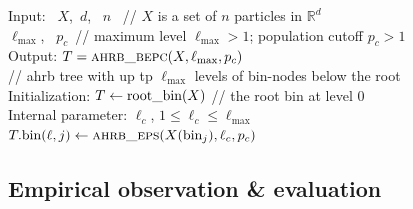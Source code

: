 \documentclass[final]{juliacon}
\begin{document}
\begin{algorithm}[h] 
  \caption{\small%
    AHRB\_BECP for {\sc ahrb} construction }
  \label{alg:block-ECP} 
  \small
  \SetAlgoLined
  {\rm Input:\ }
  $X$,\, $d$, \,  $n$   
   \, \phantom{x}
  // {\footnotesize $X$ is a set of $n$ particles in $\mathbb{R}^d$} 
  \\
  \phantom{xx}
  $\ell_{\max} $, \, $p_c$\,
  \phantom{x}
  // {\footnotesize maximum level $\ell_{\max}\!>\!1 $;
                    population cutoff $p_c\! >\!1$ } 
  \\
 {\rm Output:}\phantom{xx}
  $ T = \mbox{\sc ahrb\_bepc}(X,\ell_{\max}, p_c)$
  \\ \phantom{xxx}
  // {\footnotesize {\sc ahrb} tree with up tp $\ell_{\max}$ levels of bin-nodes
    below the root} 
  \\
  {\rm Initialization:} $T \gets \mbox{\rm root\_bin}(X) $
  \phantom{xx} // the root bin at level $0$ 
  \\
  {\rm Internal parameter:} $\ell_c$, $1\leq \ell_c\leq \ell_{\max}$
  \\
  { %
    { %
    $ T.\mbox{\rm bin}(\ell,j)  \gets 
    \mbox{\sc ahrb\_eps}( X(\mbox{\rm bin}_j), \ell_c, p_c) $  
    } %
  } %
%
%
\end{algorithm}
 
\subsection{Empirical observation \& evaluation}
\label{sec:empirical-evaluation}

%
%
%
%
%
\end{document}
